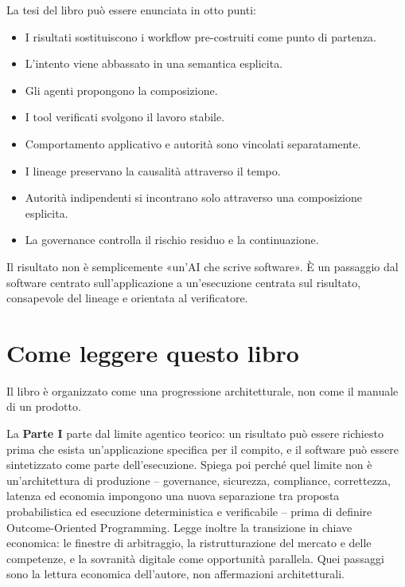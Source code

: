 \documentclass[10pt,oneside,openany]{book}
\begin{document}
\noindent\begin{minipage}{\linewidth}
La tesi del libro può essere enunciata in otto punti:

{\sffamily\small
\begin{itemize}\setlength{\itemsep}{1pt}\setlength{\parskip}{0pt}
\item I risultati sostituiscono i workflow pre-costruiti come punto di partenza.
\item L'intento viene abbassato in una semantica esplicita.
\item Gli agenti propongono la composizione.
\item I tool verificati svolgono il lavoro stabile.
\item Comportamento applicativo e autorità sono vincolati separatamente.
\item I lineage preservano la causalità attraverso il tempo.
\item Autorità indipendenti si incontrano solo attraverso una composizione esplicita.
\item La governance controlla il rischio residuo e la continuazione.
\end{itemize}}
\end{minipage}
\vspace{2pt}


Il risultato non è semplicemente «un'AI che scrive software». È un passaggio dal software centrato sull'applicazione a un'esecuzione centrata sul risultato, consapevole del lineage e orientata al verificatore.

\tableofcontents
\clearpage

\chapter*{Come leggere questo libro}
Il libro è organizzato come una progressione architetturale, non come il manuale di un prodotto.

La \textbf{Parte I} parte dal limite agentico teorico: un risultato può essere richiesto prima che esista un'applicazione specifica per il compito, e il software può essere sintetizzato come parte dell'esecuzione. Spiega poi perché quel limite non è un'architettura di produzione -- governance, sicurezza, compliance, correttezza, latenza ed economia impongono una nuova separazione tra proposta probabilistica ed esecuzione deterministica e verificabile -- prima di definire Outcome-Oriented Programming. Legge inoltre la transizione in chiave economica: le finestre di arbitraggio, la ristrutturazione del mercato e delle competenze, e la sovranità digitale come opportunità parallela. Quei passaggi sono la lettura economica dell'autore, non affermazioni architetturali.
\end{document}
